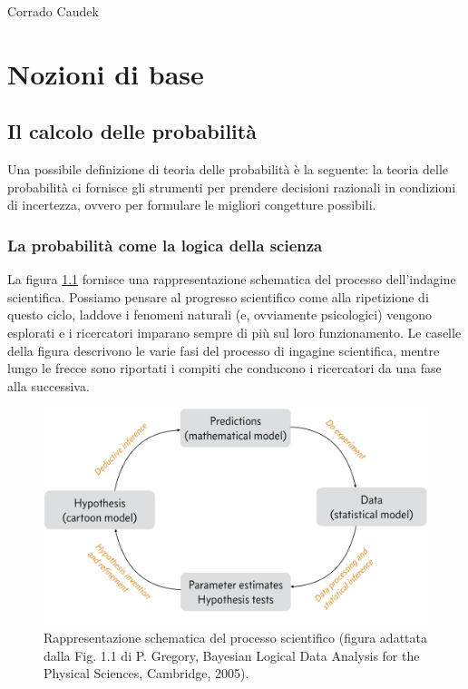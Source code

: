 \documentclass[
  10pt,
  italian,
  a4paper,
  extrafontsizes,onecolumn,openright
  ]{memoir}
\theoremstyle{definition}
\theoremstyle{definition}
\theoremstyle{definition}
\theoremstyle{definition}
\theoremstyle{remark}
\begin{document}
\bigskip

Corrado Caudek

\mainmatter

\hypertarget{part-nozioni-di-base}{%
\part*{Nozioni di base}\label{part-nozioni-di-base}}

\hypertarget{intro-prob-1}{%
\chapter{Il calcolo delle probabilità}\label{intro-prob-1}}

Una possibile definizione di teoria delle probabilità è la seguente: la teoria delle probabilità ci fornisce gli strumenti per prendere decisioni razionali in condizioni di incertezza, ovvero per formulare le migliori congetture possibili.

\hypertarget{inf-stat-probl-inv}{%
\section{La probabilità come la logica della scienza}\label{inf-stat-probl-inv}}

La figura \ref{fig:cycle-of-science} fornisce una rappresentazione schematica del processo dell'indagine scientifica. Possiamo pensare al progresso scientifico come alla ripetizione di questo ciclo, laddove i fenomeni naturali (e, ovviamente psicologici) vengono esplorati e i ricercatori imparano sempre di più sul loro funzionamento. Le caselle della figura descrivono le varie fasi del processo di ingagine scientifica, mentre lungo le frecce sono riportati i compiti che conducono i ricercatori da una fase alla successiva.

\begin{figure}[h]

{\centering \includegraphics[width=0.8\linewidth]{images/cycle_of_science} 

}

\caption{Rappresentazione schematica del processo scientifico (figura adattata dalla Fig. 1.1 di P. Gregory, Bayesian Logical Data Analysis for the Physical Sciences, Cambridge, 2005).}\label{fig:cycle-of-science}
\end{figure}
\end{document}
